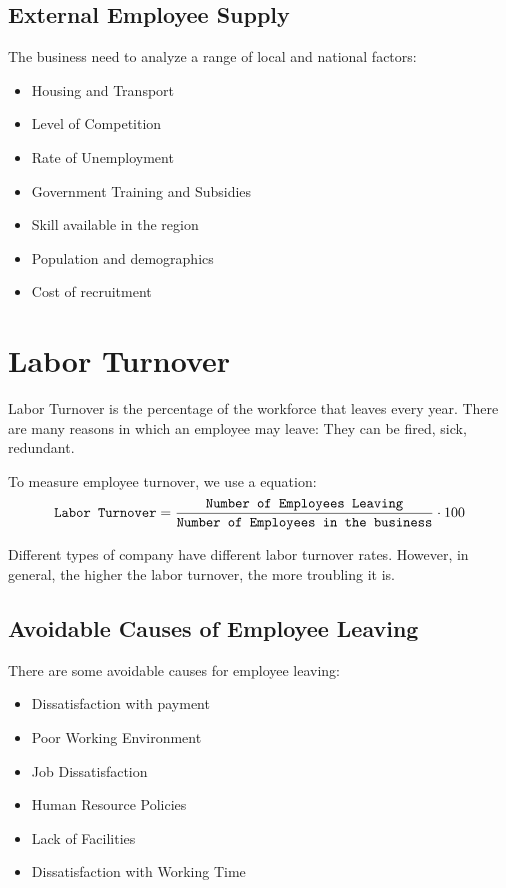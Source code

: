 \documentclass{report}
\begin{document}
\subsection{External Employee Supply}
The business need to analyze a range of local and national factors:
\begin{itemize}
	\item Housing and Transport
	\item Level of Competition
	\item Rate of Unemployment
	\item Government Training and Subsidies
	\item Skill available in the region
	\item Population and demographics
	\item Cost of recruitment
\end{itemize}

\section{Labor Turnover}\label{LaborTurnover}
Labor Turnover is the percentage of the workforce that leaves every year.
There are many reasons in which an employee may leave:
They can be fired, sick, redundant.

To measure employee turnover, we use a equation:
\begin{equation}
	\texttt{Labor Turnover} = \frac{\texttt{Number of Employees Leaving}}{ \texttt{Number of Employees in the business} } \cdot 100 \\
\end{equation}

Different types of company have different labor turnover rates. 
However, in general, the higher the labor turnover, the more troubling it is.

\subsection{Avoidable Causes of Employee Leaving}
There are some avoidable causes for employee leaving:
\begin{itemize}
	\item Dissatisfaction with payment
	\item Poor Working Environment
	\item Job Dissatisfaction
	\item Human Resource Policies
	\item Lack of Facilities
	\item Dissatisfaction with Working Time
\end{itemize}
\end{document}
